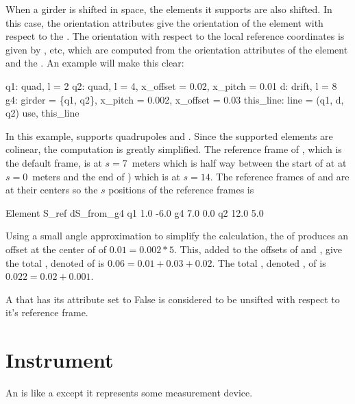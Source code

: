 When a girder is shifted in space, the elements
it supports are also shifted.  In this case, the orientation
attributes give the orientation of
the element with respect to the . The orientation with
respect to the local reference coordinates is given by
, etc, which are computed from the orientation attributes
of the element and the . An example will make this clear:
\begin{example}
  q1: quad, l = 2
  q2: quad, l = 4, x_offset = 0.02, x_pitch = 0.01
  d: drift, l = 8
  g4: girder = \{q1, q2\}, x_pitch = 0.002, x_offset = 0.03
  this_line: line = (q1, d, q2)
  use, this_line
\end{example}
In this example,  supports quadrupoles  and .
Since the supported elements are colinear, the computation is greatly
simplified. The reference frame of , which is the default
 frame, is at $s = 7$~meters which is half way between the
start of  at at $s = 0$~meters and the end of ) which is
at $s = 14$. The reference frames of  and  are at their
centers so the $s$ positions of the reference frames is
\begin{example}
  Element        S_ref   dS_from_g4
  q1             1.0     -6.0
  g4             7.0      0.0
  q2            12.0      5.0
\end{example}
Using a small angle approximation to simplify the calculation, the  of  produces
an offset at the center of  of $0.01 = 0.002 * 5$. This, added to the offsets of  and
, give the total , denoted  of  is 
$0.06 = 0.01 + 0.03 + 0.02$. 
The total , denoted , of  is $0.022 = 0.02 + 0.001$.

A  that has its  attribute set to False is considered to be unsifted with
respect to it's reference frame.

\section{Instrument}
\label{s:instrument}

An  is like a  except it represents some measurement device.

